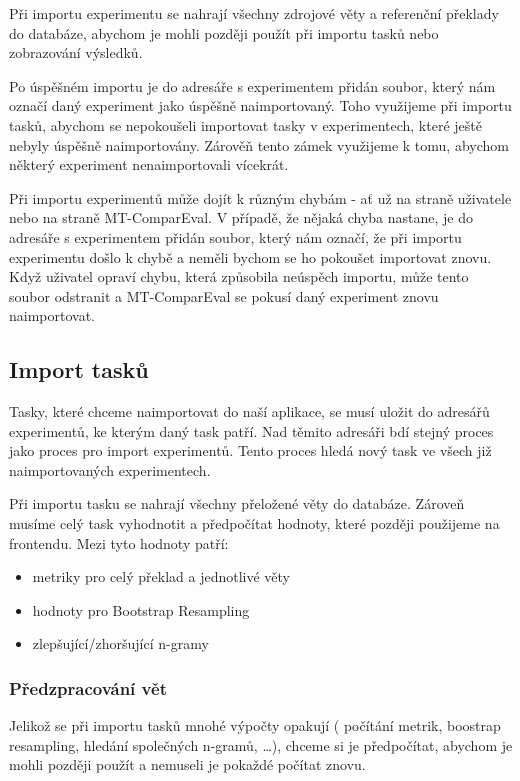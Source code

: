 Při importu experimentu se nahrají všechny zdrojové věty
  a referenční překlady do databáze,
  abychom je mohli později použít při importu tasků
  nebo zobrazování výsledků.

Po úspěšném importu je do adresáře s experimentem přidán soubor,
  který nám označí daný experiment jako úspěšně naimportovaný.
Toho využijeme při importu tasků,
  abychom se nepokoušeli importovat tasky v experimentech,
  které ještě nebyly úspěšně naimportovány.
Zárověň tento zámek využijeme k tomu,
  abychom některý experiment nenaimportovali vícekrát.

Při importu experimentů může dojít k různým chybám -
  ať už na straně uživatele nebo na straně MT-ComparEval.
V případě, že nějaká chyba nastane,
  je do adresáře s experimentem přidán soubor,
  který nám označí,
  že při importu experimentu došlo k chybě
  a neměli bychom se ho pokoušet importovat znovu.
Když uživatel opraví chybu,
  která způsobila neúspěch importu,
  může tento soubor odstranit
  a MT-ComparEval se pokusí daný experiment znovu naimportovat.

\subsection{Import tasků}
Tasky, které chceme naimportovat do naší aplikace,
  se musí uložit do adresářů experimentů,
  ke kterým daný task patří.
Nad těmito adresáři bdí stejný proces
  jako proces pro import experimentů.
Tento proces hledá nový task ve všech již 
  naimportovaných experimentech.

Při importu tasku se nahrají všechny přeložené věty do databáze.
Zároveň musíme celý task vyhodnotit a předpočítat hodnoty,
  které později použijeme na frontendu.
Mezi tyto hodnoty patří:
\begin{itemize}
	\item metriky pro celý překlad a jednotlivé věty
	\item hodnoty pro Bootstrap Resampling 
	\item zlepšující/zhoršující \mbox{n-gramy}
\end{itemize}

\subsubsection{Předzpracování vět}
Jelikož se při importu tasků mnohé výpočty opakují
  ( počítání metrik, boostrap resampling, hledání společných \mbox{n-gramů}, \dots ),
  chceme si je předpočítat,
  abychom je mohli později použít a nemuseli je pokaždé počítat znovu.

